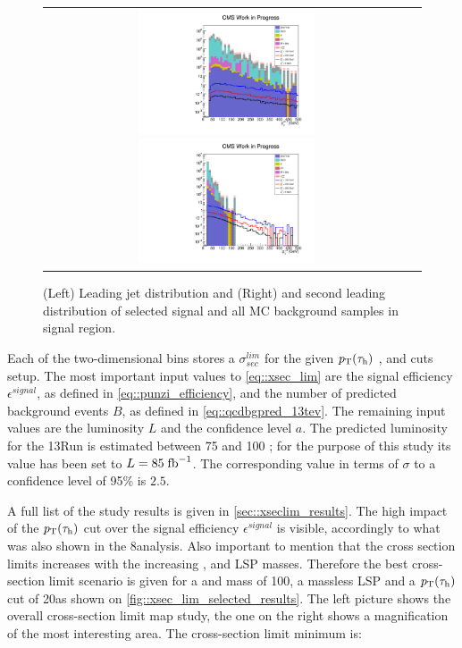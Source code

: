 \begin{figure}[tbh!]
	\centering
	\begin{tabular}{cc}
		\includegraphics[width=0.5\textwidth]{analysis/pics/h_jet1pt_Taui2TightIso.pdf}
		\includegraphics[width=0.5\textwidth]{analysis/pics/h_tau2pt_Taui2TightIso.pdf} 		
	\end{tabular}
	\caption{(Left) Leading jet \pt distribution and (Right) and second leading \hadtau \pt distribution of selected signal and all MC background samples in signal region.}
	\label{fig::crplots2_Taui2TightIso_13tev_results}
\end{figure}


Each of the two-dimensional bins stores a $\sigma^{lim}_{sec}$ for the given $p_{\text{T}}(\tau_{\text{h}})$ , \mjj and \met cuts setup. The most important input values to \autoref{eq::xsec_lim} are the signal efficiency $\epsilon^{signal}$, as defined in \autoref{eq::punzi_efficiency},  and the number of predicted background events $B$, as defined in \autoref{eq::qcdbgpred_13tev}. The remaining input values are the luminosity $L$ and the confidence level $a$. The predicted luminosity for the 13\tev Run \cite{Bruning:2002yh} is estimated between 75 and 100 \invfb; for the purpose of this study its value has been set to $L = 85\;\text{fb}^{-1}$. The corresponding value in terms of $\sigma$ to a confidence level of 95\%  is $2.5$.

A full list of the study results is given in \autoref{sec::xseclim_results}. The high impact of the $p_{\text{T}}(\tau_{\text{h}})$ cut over the signal efficiency $\epsilon^{signal}$ is visible, accordingly to what was also shown in the 8\tev analysis. Also important to mention that the cross section limits increases with the increasing \charginopm, \neutralinotwo and LSP masses. Therefore the best cross-section limit scenario is given for a \charginopm and \neutralinotwo mass of 100\gev, a massless LSP and a $p_{\text{T}}(\tau_{\text{h}})$ cut of 20\gev as shown on \autoref{fig::xsec_lim_selected_results}. The left picture shows the overall cross-section limit map study, the one on the right shows a magnification of the most interesting area. The cross-section limit minimum is:

